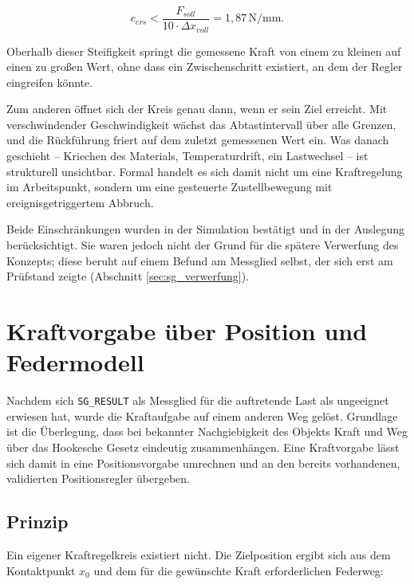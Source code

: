 \begin{equation}
    c_{ers} < \frac{F_{soll}}{10 \cdot \Delta x_{voll}} = 1{,}87\,\mathrm{N/mm} .
    \label{eq:steifigkeitsgrenze}
\end{equation}

Oberhalb dieser Steifigkeit springt die gemessene Kraft von einem zu kleinen auf einen zu
großen Wert, ohne dass ein Zwischenschritt existiert, an dem der Regler eingreifen könnte.

Zum anderen öffnet sich der Kreis genau dann, wenn er sein Ziel erreicht. Mit
verschwindender Geschwindigkeit wächst das Abtastintervall über alle Grenzen, und die
Rückführung friert auf dem zuletzt gemessenen Wert ein. Was danach geschieht -- Kriechen
des Materials, Temperaturdrift, ein Lastwechsel -- ist strukturell unsichtbar. Formal
handelt es sich damit nicht um eine Kraftregelung im Arbeitspunkt, sondern um eine
gesteuerte Zustellbewegung mit ereignisgetriggertem Abbruch.

Beide Einschränkungen wurden in der Simulation bestätigt und in der Auslegung
berücksichtigt. Sie waren jedoch nicht der Grund für die spätere Verwerfung des Konzepts;
diese beruht auf einem Befund am Messglied selbst, der sich erst am Prüfstand zeigte
(Abschnitt \ref{sec:sg_verwerfung}).

\section{Kraftvorgabe über Position und Federmodell}
\label{sec:kraft_position}

Nachdem sich \texttt{SG\_RESULT} als Messglied für die auftretende Last als ungeeignet
erwiesen hat, wurde die Kraftaufgabe auf einem anderen Weg gelöst. Grundlage ist die
Überlegung, dass bei bekannter Nachgiebigkeit des Objekts Kraft und Weg über das
Hookesche Gesetz eindeutig zusammenhängen. Eine Kraftvorgabe lässt sich damit in eine
Positionsvorgabe umrechnen und an den bereits vorhandenen, validierten Positionsregler
übergeben.

\subsection*{Prinzip}

Ein eigener Kraftregelkreis existiert nicht. Die Zielposition ergibt sich aus dem
Kontaktpunkt $x_0$ und dem für die gewünschte Kraft erforderlichen Federweg:

